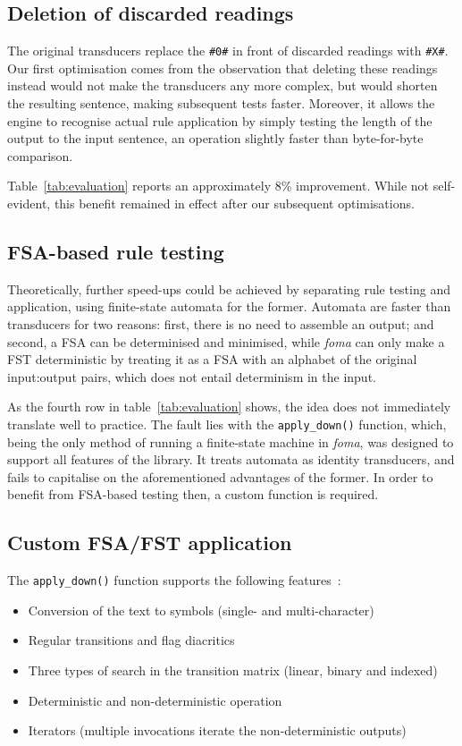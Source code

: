 \documentclass[11pt]{article}
\begin{document}
\subsection{Deletion of discarded readings}
\label{sec:speed_deletex}

The original transducers replace the \texttt{\#0\#} in front of discarded readings
with \texttt{\#X\#}. Our first optimisation comes from the observation that
deleting these readings instead would not make the transducers any more complex,
but would shorten the resulting sentence, making subsequent tests faster.
Moreover, it allows the engine to recognise actual rule application by simply
testing the length of the output to the input sentence, an operation slightly
faster than byte-for-byte comparison.

Table~\ref{tab:evaluation} reports an approximately 8\% improvement. While not
self-evident, this benefit remained in effect after our subsequent optimisations.

\subsection{FSA-based rule testing}
\label{sec:speed_fsa}

Theoretically, further speed-ups could be achieved by separating rule testing
and application, using finite-state automata for the former. Automata are faster
than transducers for two reasons: first, there is no need to assemble an output;
and second, a FSA can be determinised and minimised, while \emph{foma} can
only make a FST deterministic by treating it as a FSA with an alphabet of the
original input:output pairs, which does not entail determinism in the input.

As the fourth row in table~\ref{tab:evaluation} shows, the idea does not immediately
translate well to practice. The fault lies with the \texttt{apply\_down()}
function, which, being the only method of running a finite-state machine in
\emph{foma}, was designed to support all features of the library. It treats
automata as identity transducers, and fails to capitalise
on the aforementioned advantages of the former. In order to benefit from 
FSA-based testing then, a custom function is required.

\subsection{Custom FSA/FST application}
\label{sec:speed_custom}

The \texttt{apply\_down()} function supports the following features~\cite{Hulden:2009b}:
\begin{itemize}
  \item Conversion of the text to symbols (single- and multi-character)
  \item Regular transitions and flag diacritics
  \item Three types of search in the transition matrix (linear, binary and indexed)
  \item Deterministic and non-deterministic operation
  \item Iterators (multiple invocations iterate the non-deterministic outputs)
\end{itemize}
\end{document}
